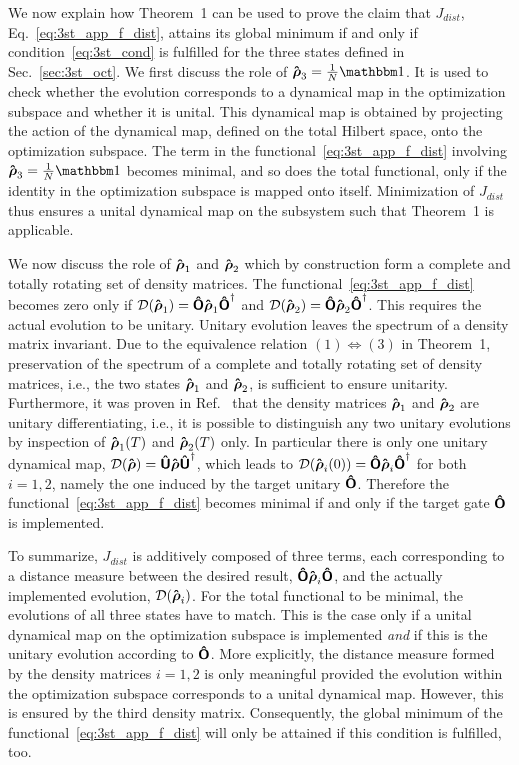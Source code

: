 We now explain how Theorem~1 can be used to prove the claim that
$J_{dist}$, Eq.~\eqref{eq:3st_app_f_dist},
attains its global minimum if and only if condition~\eqref{eq:3st_cond}
is fulfilled for the three states defined in Sec.~\ref{sec:3st_oct}. We
first discuss the role of $\Op\rho_3 = \frac{1}{N} \openone$. It is used
to check whether the evolution corresponds to a dynamical map in the
optimization subspace and whether it is unital. This
dynamical map is obtained by
projecting the action of the dynamical map, defined on the total
Hilbert space,
onto the optimization subspace.
The term in the functional~\eqref{eq:3st_app_f_dist} involving $\Op\rho_3 =
\frac{1}{N} \openone$ becomes minimal, and so does the total
functional, only if the identity in the optimization subspace is
mapped onto itself. Minimization of $J_{dist}$ thus ensures a unital
dynamical map on the subsystem such that Theorem~1 is applicable.

We now discuss the role of $\boldsymbol{\mathsf{\hat{\rho}}}_1$ and $\boldsymbol{\mathsf{\hat{\rho}}}_2$ which by construction
form a complete and totally rotating set of density matrices. The
functional~\eqref{eq:3st_app_f_dist}
becomes zero only if $\mathcal{D}(\boldsymbol{\mathsf{\hat{\rho}}}_1) = \boldsymbol{\mathsf{\hat{O}}} \boldsymbol{\mathsf{\hat{\rho}}}_1 \boldsymbol{\mathsf{\hat{O}}}^\dagger$ and $\mathcal{D}(\boldsymbol{\mathsf{\hat{\rho}}}_2) = \boldsymbol{\mathsf{\hat{O}}} \boldsymbol{\mathsf{\hat{\rho}}}_2 \boldsymbol{\mathsf{\hat{O}}}^\dagger$. This requires the actual evolution to be unitary. Unitary
evolution leaves the spectrum of a density matrix invariant. Due to
the equivalence relation $(1)\Longleftrightarrow (3)$ in Theorem~1,
preservation of
the spectrum of a complete and totally rotating set of density matrices, i.e.,
the two states $\boldsymbol{\mathsf{\hat{\rho}}}_1$ and $\boldsymbol{\mathsf{\hat{\rho}}}_2$, is sufficient to ensure
unitarity.
Furthermore, it was proven in Ref.~\cite{ReichKochPRA13} that the density
matrices $\boldsymbol{\mathsf{\hat{\rho}}}_{1}$ and $\boldsymbol{\mathsf{\hat{\rho}}}_{2}$ are
unitary differentiating, i.e., it is possible to distinguish any two
unitary evolutions by inspection of $\boldsymbol{\mathsf{\hat{\rho}}}_{1}(T)$ and $\boldsymbol{\mathsf{\hat{\rho}}}_{2}(T)$
only. In particular there is only one unitary dynamical map,
$\mathcal{D}(\boldsymbol{\mathsf{\hat{\rho}}}) = \boldsymbol{\mathsf{\hat{U}}} \boldsymbol{\mathsf{\hat{\rho}}} \boldsymbol{\mathsf{\hat{U}}}^\dagger$, which leads to
$\mathcal{D}(\boldsymbol{\mathsf{\hat{\rho}}}_{i}(0)) = \boldsymbol{\mathsf{\hat{O}}} \boldsymbol{\mathsf{\hat{\rho}}}_i \boldsymbol{\mathsf{\hat{O}}}^\dagger$ for both $
i=1,2$, namely the one induced by the target unitary $\boldsymbol{\mathsf{\hat{O}}}$. Therefore
the functional~\eqref{eq:3st_app_f_dist} becomes minimal if and only if
the target gate $\boldsymbol{\mathsf{\hat{O}}}$ is implemented.

To summarize, $J_{dist}$ is additively composed of three terms,
each corresponding to a distance measure between the desired result,
$\boldsymbol{\mathsf{\hat{O}}} \boldsymbol{\mathsf{\hat{\rho}}}_i \boldsymbol{\mathsf{\hat{O}}}$, and the actually implemented evolution,
$\mathcal{D}(\boldsymbol{\mathsf{\hat{\rho}}}_i)$. For the total functional to be minimal, the
evolutions of all three states have to match. This
is the case only if a unital dynamical map on the optimization
subspace is implemented \emph{and} if this is the unitary evolution
according to $\boldsymbol{\mathsf{\hat{O}}}$. More explicitly, the distance measure formed by the
density matrices $i=1,2$ is only meaningful provided the evolution
within the optimization subspace corresponds to a unital dynamical map.
However, this is ensured by the third density matrix. Consequently, the 
global minimum of the functional~\eqref{eq:3st_app_f_dist} will 
only be attained if this condition is fulfilled, too.

